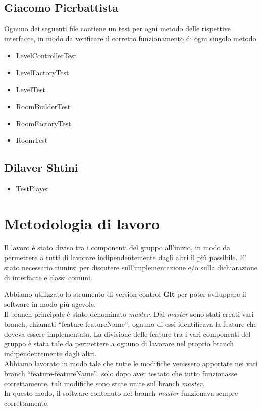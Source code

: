 \documentclass[a4paper,12pt]{report}
\begin{document}
\subsection*{Giacomo Pierbattista}
Ognuno dei seguenti file contiene un test per ogni metodo delle rispettive interfacce, in modo da verificare
il corretto funzionamento di ogni singolo metodo.
\begin{itemize}
    \item LevelControllerTest
    \item LevelFactoryTest
    \item LevelTest
    \item RoomBuilderTest
    \item RoomFactoryTest
    \item RoomTest
\end{itemize}

\subsection*{Dilaver Shtini}
\begin{itemize}
    \item TestPlayer
\end{itemize}



\section{Metodologia di lavoro}
Il lavoro è stato diviso tra i componenti del gruppo all'inizio, in modo da permettere a tutti di 
lavorare indipendentemente dagli altri il più possibile.
E' stato necessario riunirsi per discutere sull'implementazione e/o sulla dichiarazione di interfacce e 
classi comuni.

Abbiamo utilizzato lo strumento di version control \textbf{Git} per poter sviluppare 
il software in modo più agevole.
\\Il branch principale è stato denominato \textit{master}.
Dal \textit{master} sono stati creati vari branch, chiamati ``feature-featureName''; 
ognuno di essi identificava la feature che doveva essere implementata. 
La divisione delle feature tra i vari componenti del gruppo è stata tale da permettere 
a ognuno di lavorare nel proprio branch indipendentemente dagli altri.
\\Abbiamo lavorato in modo tale che tutte le modifiche venissero apportate nei vari branch 
``feature-featureName''; solo dopo aver testato che tutto funzionasse correttamente, 
tali modifiche sono state unite sul branch \textit{master}.
\\In questo modo, il software contenuto nel branch \textit{master} funzionava sempre correttamente.
\end{document}
